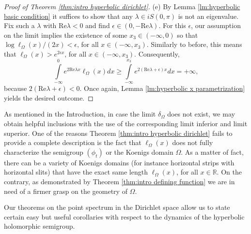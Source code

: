 \documentclass[11pt]{amsart}
\numberwithin{equation}{section}
\theoremstyle{definition}
\begin{document}
\begin{proof}[Proof of Theorem \ref{thm:intro hyperbolic dirichlet}]
		(e) By Lemma \ref{lm:hyperbolic basic condition} it suffices to show that any $\lambda\in iS(0,\pi)$ is not an eigenvalue. Fix such a $\lambda$ with $\mathrm{Re}\lambda<0$ and find $\epsilon\in(0,-\mathrm{Re}\lambda)$. For this $\epsilon$, our assumption on the limit implies the existence of some $x_3\in(-\infty,0)$ so that $\log\ell_\Omega(x)/(2x)<\epsilon$, for all $x\in(-\infty,x_3)$. Similarly to before, this means that $\ell_\Omega(x)>e^{2\epsilon x}$, for all $x\in(-\infty,x_3)$. Consequently,
		\begin{equation*}
			\int\limits_{-\infty}^{0}e^{2\mathrm{Re}\lambda x}\ell_\Omega(x)dx\ge\int\limits_{-\infty}^{x_3}e^{2(\mathrm{Re}\lambda+\epsilon)x}dx=+\infty,
		\end{equation*}
		because $2(\mathrm{Re}\lambda+\epsilon)<0$. Once again, Lemma \ref{lm:hyperbolic x parametrization} yields the desired outcome.
	\end{proof}
	
	As mentioned in the Introduction, in case the limit $\delta_\Omega$ does not exist, we may obtain helpful inclusions with the use of the corresponding limit inferior and limit superior. One of the reasons Theorem \ref{thm:intro hyperbolic dirichlet} fails to provide a complete description is the fact that $\ell_\Omega(x)$ does not fully characterize the semigroup $(\phi_t)$ or the Koenigs domain $\Omega$. As a matter of fact, there can be a variety of Koenigs domains (for instance horizontal strips with horizontal slits) that have the exact same length $\ell_\Omega(x)$, for all $x\in\mathbb{R}$. On the contrary, as demonstrated by Theorem \ref{thm:intro defining function} we are in need of a firmer grasp on the geometry of $\Omega$.
	
	Our theorems on the point spectrum in the Dirichlet space allow us to state certain easy but useful corollaries with respect to the dynamics of the hyperbolic holomorphic semigroup.
	
\end{document}
